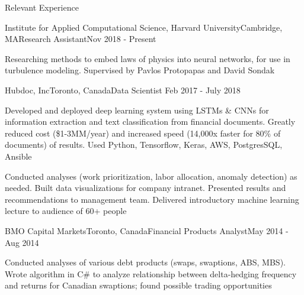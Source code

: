 \documentclass{resume} %
\begin{document}
\begin{rSection}{Relevant Experience}

\begin{rSubsection}{Institute for Applied Computational Science, Harvard University}{Cambridge, MA}{Research Assistant}{Nov 2018 - Present}
\item Researching methods to embed laws of physics into neural networks, for use in turbulence modeling. Supervised by Pavlos Protopapas and David Sondak
\end{rSubsection}


\begin{rSubsection}{Hubdoc, Inc}{Toronto, Canada}{Data Scientist}{ Feb 2017 - July 2018}
\item Developed and deployed deep learning system using LSTMs \& CNNs for information extraction and text classification from financial documents. Greatly reduced cost (\$1-3MM/year) and increased speed (14,000x faster for 80\% of documents) of results. Used Python, Tensorflow, Keras, AWS, PostgresSQL, Ansible
\item Conducted analyses (work prioritization, labor allocation, anomaly detection) as needed. Built data visualizations for company intranet. Presented results and recommendations to management team. Delivered introductory machine learning lecture to audience of 60+ people
\end{rSubsection}


\begin{rSubsection}{BMO Capital Markets}{Toronto, Canada}{Financial Products Analyst}{May 2014 - Aug 2014}
\item Conducted analyses of various debt products (swaps, swaptions, ABS, MBS). Wrote algorithm in C\# to analyze relationship between delta-hedging frequency and returns for Canadian swaptions; found possible trading opportunities
\end{rSubsection}

\end{rSection}

\end{document}
